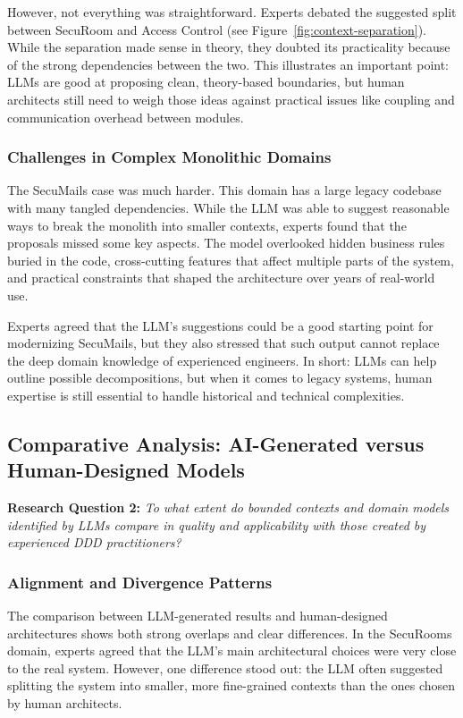 However, not everything was straightforward. Experts debated the suggested split between SecuRoom and Access Control (see Figure~\ref{fig:context-separation}). While the separation made sense in theory, they doubted its practicality because of the strong dependencies between the two. This illustrates an important point: LLMs are good at proposing clean, theory-based boundaries, but human architects still need to weigh those ideas against practical issues like coupling and communication overhead between modules.

\subsubsection{Challenges in Complex Monolithic Domains}
The SecuMails case was much harder. This domain has a large legacy codebase with many tangled dependencies. While the LLM was able to suggest reasonable ways to break the monolith into smaller contexts, experts found that the proposals missed some key aspects. The model overlooked hidden business rules buried in the code, cross-cutting features that affect multiple parts of the system, and practical constraints that shaped the architecture over years of real-world use.

Experts agreed that the LLM's suggestions could be a good starting point for modernizing SecuMails, but they also stressed that such output cannot replace the deep domain knowledge of experienced engineers. In short: LLMs can help outline possible decompositions, but when it comes to legacy systems, human expertise is still essential to handle historical and technical complexities.

\subsection{Comparative Analysis: AI-Generated versus Human-Designed Models}

\textbf{Research Question 2:} \textit{To what extent do bounded contexts and domain models identified by LLMs compare in quality and applicability with those created by experienced DDD practitioners?}

\subsubsection{Alignment and Divergence Patterns}
The comparison between LLM-generated results and human-designed architectures shows both strong overlaps and clear differences. In the SecuRooms domain, experts agreed that the LLM's main architectural choices were very close to the real system. However, one difference stood out: the LLM often suggested splitting the system into smaller, more fine-grained contexts than the ones chosen by human architects. 

